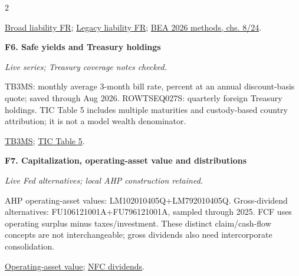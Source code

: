 \documentclass[10pt,a4paper,landscape]{article}
\begin{document}
\begin{multicols}{2}
\begin{minipage}{\linewidth}
\par \href{https://fred.stlouisfed.org/series/BOGZ1FR263081005Q}{Broad liability FR}; \href{https://fred.stlouisfed.org/series/BOGZ1FR263081115Q}{Legacy liability FR}; \href{https://www.bea.gov/sites/default/files/2026-06/BEA-International-Economic-Accounts-Concepts-and-Methods.pdf}{BEA 2026 methods, chs. 8/24}.

\end{minipage}\par\vspace{6pt}

\noindent\begin{minipage}{\linewidth}\raggedright

\hypertarget{src-F6}{\textbf{F6. Safe yields and Treasury holdings}}\par

{\footnotesize\itshape Live series; Treasury coverage notes checked.}\par

TB3MS: monthly average 3-month bill rate, percent at an annual discount-basis quote; saved through Aug 2026. ROWTSEQ027S: quarterly foreign Treasury holdings. TIC Table 5 includes multiple maturities and custody-based country attribution; it is not a model wealth denominator.

\par \href{https://fred.stlouisfed.org/series/TB3MS}{TB3MS}; \href{https://ticdata.treasury.gov/Publish/slt_table5.html}{TIC Table 5}.

\end{minipage}\par\vspace{6pt}

\noindent\begin{minipage}{\linewidth}\raggedright

\hypertarget{src-F7}{\textbf{F7. Capitalization, operating-asset value and distributions}}\par

{\footnotesize\itshape Live Fed alternatives; local AHP construction retained.}\par

AHP operating-asset values: LM102010405Q+LM792010405Q. Gross-dividend alternatives: FU106121001A+FU796121001A, sampled through 2025. FCF uses operating surplus minus taxes/investment. These distinct claim/cash-flow concepts are not interchangeable; gross dividends also need intercorporate consolidation.

\par \href{https://fred.stlouisfed.org/series/BOGZ1LM102010405Q}{Operating-asset value}; \href{https://fred.stlouisfed.org/series/BOGZ1FU106121001A}{NFC dividends}.


\end{minipage}
\end{multicols}
\end{document}
